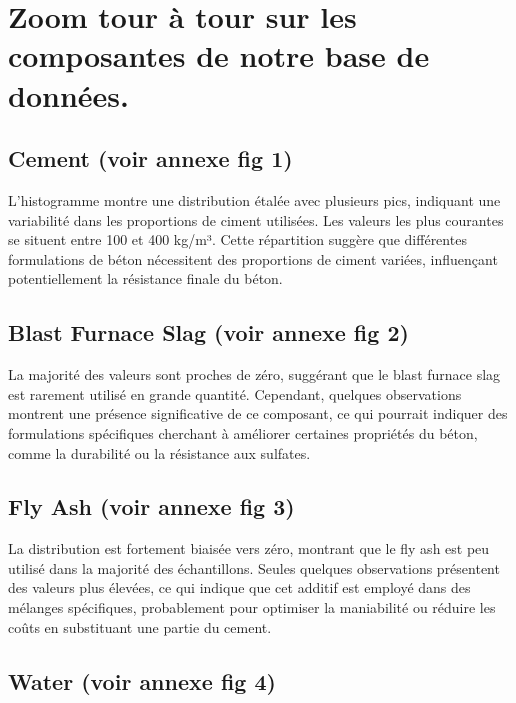 \documentclass[
  12pt,
]{article}
\begin{document}
\section{Zoom tour à tour sur les composantes de notre base de
données.}\label{zoom-tour-uxe0-tour-sur-les-composantes-de-notre-base-de-donnuxe9es.}

\subsection{Cement (voir annexe fig 1)}\label{cement-voir-annexe-fig-1}

L'histogramme montre une distribution étalée avec plusieurs pics,
indiquant une variabilité dans les proportions de ciment utilisées. Les
valeurs les plus courantes se situent entre 100 et 400 kg/m³. Cette
répartition suggère que différentes formulations de béton nécessitent
des proportions de ciment variées, influençant potentiellement la
résistance finale du béton.

\subsection{Blast Furnace Slag (voir annexe fig
2)}\label{blast-furnace-slag-voir-annexe-fig-2}

La majorité des valeurs sont proches de zéro, suggérant que le blast
furnace slag est rarement utilisé en grande quantité. Cependant,
quelques observations montrent une présence significative de ce
composant, ce qui pourrait indiquer des formulations spécifiques
cherchant à améliorer certaines propriétés du béton, comme la durabilité
ou la résistance aux sulfates.

\subsection{Fly Ash (voir annexe fig
3)}\label{fly-ash-voir-annexe-fig-3}

La distribution est fortement biaisée vers zéro, montrant que le fly ash
est peu utilisé dans la majorité des échantillons. Seules quelques
observations présentent des valeurs plus élevées, ce qui indique que cet
additif est employé dans des mélanges spécifiques, probablement pour
optimiser la maniabilité ou réduire les coûts en substituant une partie
du cement.

\subsection{Water (voir annexe fig 4)}\label{water-voir-annexe-fig-4}
\end{document}

